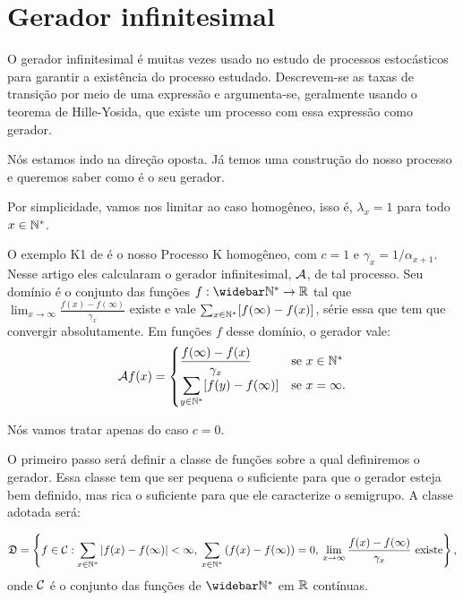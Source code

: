 
\section{Gerador infinitesimal}
\label{sec:gerador}


O gerador infinitesimal é muitas vezes usado no estudo de processos
estocásticos para garantir a existência do processo
estudado. Descrevem-se as taxas de transição por meio de uma expressão
e argumenta-se, geralmente usando o teorema de Hille-Yosida, que
existe um processo com essa expressão como gerador.

Nós estamos indo na direção oposta. Já temos uma construção do nosso
processo e queremos saber como é o seu gerador.

Por simplicidade, vamos nos limitar ao caso homogêneo, isso é,
$\lambda_x = 1$ para todo $x \in {\mathbb{N^*}}$.

O exemplo K1 de \cite{kendall:56} é o nosso Processo K homogêneo, com
$c = 1$ e $\gamma_x = 1/\alpha_{x+1}$. Nesse artigo eles calcularam o
gerador infinitesimal, ${\mathcal{A}}$, de tal processo. Seu domínio é o
conjunto das funções $f: \Nzb \to \R$ tal que $\lim_{x \to \infty}
\frac{f(x) - f(\infty)}{\gamma_x}$ existe e vale $\sum_{x \in {\mathbb{N^*}}}
[f(\infty) - f(x)]$, série essa que tem que convergir
absolutamente. Em funções $f$ desse domínio, o gerador vale:
\begin{align*}
  {\mathcal{A}} f (x) = \begin{cases}
    \displaystyle
    \frac{f(\infty) - f(x)}{\gamma_x} & \text{se } x \in {\mathbb{N^*}}\\
    \displaystyle
    \sum_{y\in {\mathbb{N^*}}} [f(y) - f(\infty)] & \text{se } x = \infty.
  \end{cases}
\end{align*}

Nós vamos tratar apenas do caso $c = 0$.

O primeiro passo será definir a classe de funções sobre a qual
definiremos o gerador. Essa classe tem que ser pequena o suficiente
para que o gerador esteja bem definido, mas rica o suficiente para que
ele caracterize o semigrupo. A classe adotada será:

\begin{equation}
  \label{eq:classe-gerador}
  {\mathfrak{D}} = \left\{ f \in {\mathcal{C}}: \sum_{x\in {\mathbb{N^*}}} |f(x)-f(\infty)| < \infty,
    \:
    \sum_{x\in {\mathbb{N^*}}} \left( f(x)-f(\infty)\right) = 0, \:
    \lim_{x \to \infty} \frac{f(x) - f(\infty)}{\gamma_x} \textrm{ existe}
  \right\},
\end{equation}
onde ${\mathcal{C}}$ é o conjunto das funções de $\Nzb$ em ${\mathbb{R}}$ contínuas.

